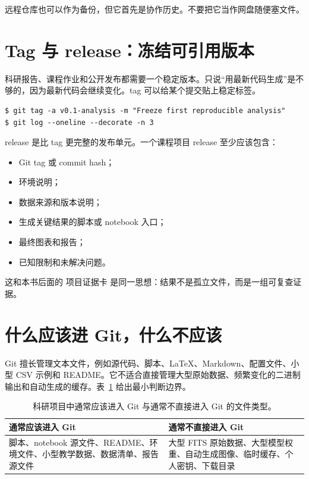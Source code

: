 远程仓库也可以作为备份，但它首先是协作历史。不要把它当作网盘随便塞文件。

\section{Tag 与 release：冻结可引用版本}

科研报告、课程作业和公开发布都需要一个稳定版本。只说“用最新代码生成”是不够的，因为最新代码会继续变化。tag 可以给某个提交贴上稳定标签。

\begin{examplebox}[创建分析版本标签]
\begin{lstlisting}[style=terminal]
$ git tag -a v0.1-analysis -m "Freeze first reproducible analysis"
$ git log --oneline --decorate -n 3
\end{lstlisting}
\end{examplebox}

release 是比 tag 更完整的发布单元。一个课程项目 release 至少应该包含：

\begin{itemize}
    \item Git tag 或 commit hash；
    \item 环境说明；
    \item 数据来源和版本说明；
    \item 生成关键结果的脚本或 notebook 入口；
    \item 最终图表和报告；
    \item 已知限制和未解决问题。
\end{itemize}

这和本书后面的 项目证据卡 是同一思想：结果不是孤立文件，而是一组可复查证据。

\section{什么应该进 Git，什么不应该}

Git 擅长管理文本文件，例如源代码、脚本、LaTeX、Markdown、配置文件、小型 CSV 示例和 README。它不适合直接管理大型原始数据、频繁变化的二进制输出和自动生成的缓存。表~\ref{tab:ch02_git_include_exclude} 给出最小判断边界。

\begin{table}[htbp]
\centering
\begin{tabular}{p{}p{}}
\toprule
通常应该进入 Git & 通常不直接进入 Git \\
\midrule
脚本、notebook 源文件、README、环境文件、小型教学数据、数据清单、报告源文件 & 大型 FITS 原始数据、大型模型权重、自动生成图像、临时缓存、个人密钥、下载目录 \\
\bottomrule
\end{tabular}
\caption{科研项目中通常应该进入 Git 与通常不直接进入 Git 的文件类型。}
\label{tab:ch02_git_include_exclude}
\end{table}

